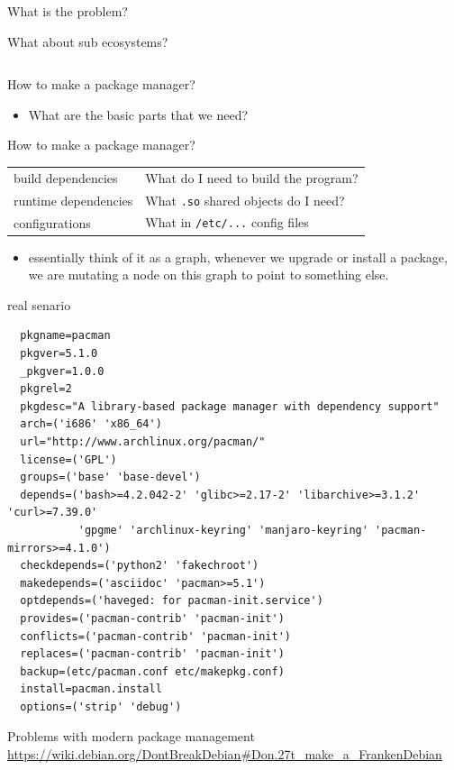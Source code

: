 \documentclass[presentation]{beamer}
\begin{document}
\begin{frame}[label={sec:org38cfab4},fragile]{What is the problem?}
\begin{block}{What about sub ecosystems?}
\begin{center}
\begin{tabular}{ll}
\end{tabular}
\end{center}
\end{block}
\begin{block}{How to make a package manager?}
\begin{itemize}
\item What are the basic parts that we need?
\end{itemize}
\end{block}
\begin{block}{How to make a package manager?}
\begin{center}
\begin{tabular}{ll}
build dependencies & What do I need to build the program?\\
runtime dependencies & What \texttt{.so} shared objects do I need?\\
configurations & What in \texttt{/etc/...} config files\\
\end{tabular}
\end{center}
\begin{itemize}
\item essentially think of it as a graph, whenever we upgrade or install a package,
we are mutating a node on this graph to point to something else.
\end{itemize}
\begin{block}{real senario}
\begin{verbatim}
  pkgname=pacman
  pkgver=5.1.0
  _pkgver=1.0.0
  pkgrel=2
  pkgdesc="A library-based package manager with dependency support"
  arch=('i686' 'x86_64')
  url="http://www.archlinux.org/pacman/"
  license=('GPL')
  groups=('base' 'base-devel')
  depends=('bash>=4.2.042-2' 'glibc>=2.17-2' 'libarchive>=3.1.2' 'curl>=7.39.0'
           'gpgme' 'archlinux-keyring' 'manjaro-keyring' 'pacman-mirrors>=4.1.0')
  checkdepends=('python2' 'fakechroot')
  makedepends=('asciidoc' 'pacman>=5.1')
  optdepends=('haveged: for pacman-init.service')
  provides=('pacman-contrib' 'pacman-init')
  conflicts=('pacman-contrib' 'pacman-init')
  replaces=('pacman-contrib' 'pacman-init')
  backup=(etc/pacman.conf etc/makepkg.conf)
  install=pacman.install
  options=('strip' 'debug')
\end{verbatim}
\end{block}
\end{block}
\begin{block}{Problems with modern package management}
\url{https://wiki.debian.org/DontBreakDebian\#Don.27t\_make\_a\_FrankenDebian}

\end{block}
\end{frame}
\end{document}
